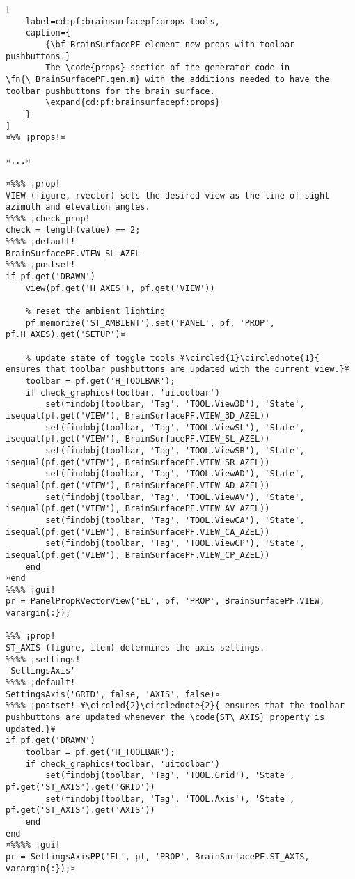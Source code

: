 \documentclass{tufte-handout}
\begin{document}
\begin{lstlisting}[
	label=cd:pf:brainsurfacepf:props_tools,
	caption={
		{\bf BrainSurfacePF element new props with toolbar pushbuttons.}
		The \code{props} section of the generator code in \fn{\_BrainSurfacePF.gen.m} with the additions needed to have the toolbar pushbuttons for the brain surface.
		\expand{cd:pf:brainsurfacepf:props}
	}
]
¤%% ¡props!¤

¤...¤

¤%%% ¡prop!
VIEW (figure, rvector) sets the desired view as the line-of-sight azimuth and elevation angles.
%%%% ¡check_prop!
check = length(value) == 2;
%%%% ¡default!
BrainSurfacePF.VIEW_SL_AZEL
%%%% ¡postset!
if pf.get('DRAWN')
    view(pf.get('H_AXES'), pf.get('VIEW'))
    
    % reset the ambient lighting
    pf.memorize('ST_AMBIENT').set('PANEL', pf, 'PROP', pf.H_AXES).get('SETUP')¤
    
    % update state of toggle tools ¥\circled{1}\circlednote{1}{ ensures that toolbar pushbuttons are updated with the current view.}¥
    toolbar = pf.get('H_TOOLBAR');
    if check_graphics(toolbar, 'uitoolbar')
        set(findobj(toolbar, 'Tag', 'TOOL.View3D'), 'State', isequal(pf.get('VIEW'), BrainSurfacePF.VIEW_3D_AZEL))
        set(findobj(toolbar, 'Tag', 'TOOL.ViewSL'), 'State', isequal(pf.get('VIEW'), BrainSurfacePF.VIEW_SL_AZEL))
        set(findobj(toolbar, 'Tag', 'TOOL.ViewSR'), 'State', isequal(pf.get('VIEW'), BrainSurfacePF.VIEW_SR_AZEL))
        set(findobj(toolbar, 'Tag', 'TOOL.ViewAD'), 'State', isequal(pf.get('VIEW'), BrainSurfacePF.VIEW_AD_AZEL))
        set(findobj(toolbar, 'Tag', 'TOOL.ViewAV'), 'State', isequal(pf.get('VIEW'), BrainSurfacePF.VIEW_AV_AZEL))
        set(findobj(toolbar, 'Tag', 'TOOL.ViewCA'), 'State', isequal(pf.get('VIEW'), BrainSurfacePF.VIEW_CA_AZEL))
        set(findobj(toolbar, 'Tag', 'TOOL.ViewCP'), 'State', isequal(pf.get('VIEW'), BrainSurfacePF.VIEW_CP_AZEL))
    end
¤end
%%%% ¡gui!
pr = PanelPropRVectorView('EL', pf, 'PROP', BrainSurfacePF.VIEW, varargin{:});

%%% ¡prop!
ST_AXIS (figure, item) determines the axis settings.
%%%% ¡settings!
'SettingsAxis'
%%%% ¡default!
SettingsAxis('GRID', false, 'AXIS', false)¤
%%%% ¡postset! ¥\circled{2}\circlednote{2}{ ensures that the toolbar pushbuttons are updated whenever the \code{ST\_AXIS} property is updated.}¥
if pf.get('DRAWN')
    toolbar = pf.get('H_TOOLBAR');
    if check_graphics(toolbar, 'uitoolbar')
        set(findobj(toolbar, 'Tag', 'TOOL.Grid'), 'State', pf.get('ST_AXIS').get('GRID'))
        set(findobj(toolbar, 'Tag', 'TOOL.Axis'), 'State', pf.get('ST_AXIS').get('AXIS'))
    end
end
¤%%%% ¡gui!
pr = SettingsAxisPP('EL', pf, 'PROP', BrainSurfacePF.ST_AXIS, varargin{:});¤


\end{lstlisting}
\end{document}
